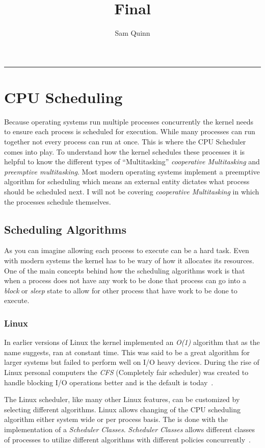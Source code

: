 \documentclass[letterpaper,10pt,notitlepage,fleqn]{article}
\title{Final}
\author{Sam Quinn}
\begin{document}
\maketitle
\hrule

\section{CPU Scheduling}
Because operating systems run multiple processes concurrently the kernel needs 
to ensure each process is scheduled for execution. While many processes can run 
together not every process can run at once. This is where the CPU Scheduler comes 
into play. To understand how the kernel schedules these processes it is helpful to 
know the different types of ``Multitasking'' \textit{cooperative Multitasking} and 
\textit{preemptive multitasking}. Most modern operating systems implement a preemptive 
algorithm for scheduling which means an external entity dictates what process should 
be scheduled next. I will not be covering \textit{cooperative Multitasking} in 
which the processes schedule themselves. 

\subsection{Scheduling Algorithms}
As you can imagine allowing each process to execute can be a hard task. Even with 
modern systems the kernel has to be wary of how it allocates its resources. One 
of the main concepts behind how the scheduling algorithms work is that when a 
process does not have any work to be done that process can go into a \textit{block} 
or \textit{sleep} state to allow for other process that have work to be done to execute.

\subsubsection*{Linux} 
In earlier versions of Linux the kernel implemented an \textit{O(1)} algorithm that 
as the name suggests, ran at constant time. This was said to be a great algorithm 
for larger systems but failed to perform well on I/O heavy devices. During the rise of
Linux personal computers the \textit{CFS} (Completely fair scheduler) was created 
to handle blocking I/O operations better and is the default is today~\cite{LKD3}.

The Linux scheduler, like many other Linux features, can be customized by selecting 
different algorithms. Linux allows changing of the CPU scheduling algorithm either system 
wide or per process basis. The is done with the implementation of a \textit{Scheduler 
Classes}. \textit{Scheduler Classes} allows different classes of processes to utilize 
different algorithms with different policies concurrently~\cite{LKD3}.
\end{document}
